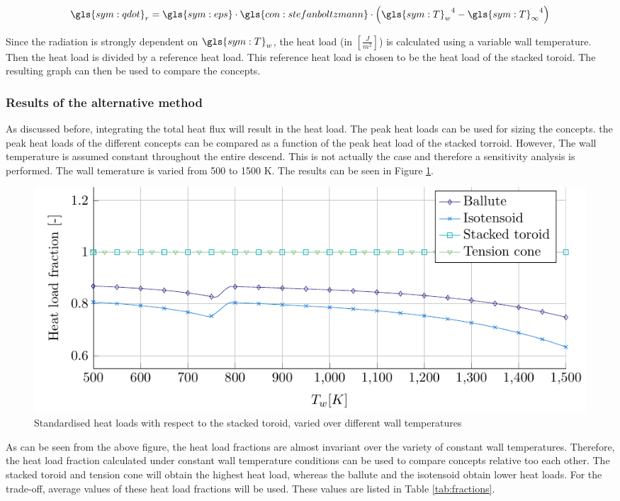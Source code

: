 \begin{equation}
\label{eq:radiation}
\gls{sym:qdot}_r = \gls{sym:eps} \cdot \gls{con:stefanboltzmann} \cdot \left( {\gls{sym:T}_w}^4 - {\gls{sym:T}_\infty}^4  \right)
\end{equation}


Since the radiation is strongly dependent on $\gls{sym:T}_w$, the heat load (in $\left[\frac{J}{m^2}\right]$) is calculated using a variable wall temperature. Then the heat load is divided by a reference heat load. This reference heat load is chosen to be the heat load of the stacked toroid. The resulting graph can then be used to compare the concepts.

\subsubsection{Results of the alternative method}
As discussed before, integrating the total heat flux will result in the heat load. The peak heat loads can be used for sizing the concepts. the peak heat loads of the different concepts can be compared as a function of the peak heat load of the stacked torroid. However, The wall temperature is assumed constant throughout the entire descend. This is not actually the case and therefore a sensitivity analysis is performed. The wall temerature is varied from 500 to 1500 K. The results can be seen in Figure \ref{fig:heatload}.

\begin{figure}[H]
	\centering
	\includegraphics{Figure/heatload.pdf}
	\caption{Standardised heat loads with respect to the stacked toroid, varied over different wall temperatures}
	\label{fig:heatload}
\end{figure}

As can be seen from the above figure, the heat load fractions are almost invariant over the variety of constant wall temperatures. Therefore, the heat load fraction calculated under constant wall temperature conditions can be used to compare concepts relative too each other. The stacked toroid and tension cone will obtain the highest heat load, whereas the ballute and the isotensoid obtain lower heat loads. For the trade-off, average values of these heat load fractions will be used. These values are listed in Table \ref{tab:fractions}.

